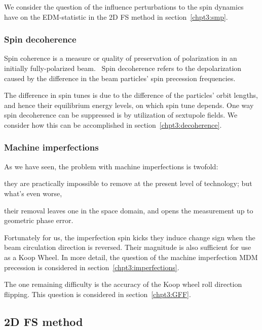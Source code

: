 We consider the question of the influence perturbations to the spin dynamics have on the EDM-statistic in the
2D FS method in section~\ref{chpt3:smp}.

\subsubsection{Spin decoherence}
Spin coherence is a measure or quality of preservation of polarization in an initially fully-polarized
beam.~\cite{Eremey:Thesis} Spin decoherence refers to the depolarization caused by the difference in the
beam particles' spin precession frequencies. 

The difference in spin tunes is due to the difference of the particles' orbit lengths, and hence their
equilibrium energy levels, on which spin tune depends. One way spin decoherence can be suppressed is by
utilization of sextupole fields. We consider how this can be accomplished in section~\ref{chpt3:decoherence}.

\subsubsection{Machine imperfections}
As we have seen, the problem with machine imperfections is twofold:
\begin{enumerate*}
\item they are practically impossible to remove at the present level of technology; but what's even worse, 
\item their removal leaves one in the space domain, and opens the measurement up to geometric phase error.
\end{enumerate*}

Fortunately for us, the imperfection spin kicks they induce change sign when the beam circulation direction
is reversed. Their magnitude is also sufficient for use as a Koop Wheel.  In more detail, the question of the machine imperfection MDM precession is considered in section~\ref{chpt3:imperfections}.

The one remaining difficulty is the accuracy of the Koop wheel roll direction flipping.
This question is considered in section~\ref{chpt3:GFF}.

\subsection{2D FS method}\label{sec:FDM_concept}

